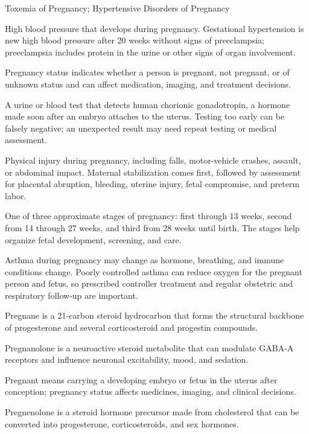 \synonyms
Toxemia of Pregnancy; Hypertensive Disorders of Pregnancy

 High blood pressure that develops during pregnancy. Gestational hypertension is new high blood pressure after 20 weeks without signs of preeclampsia; preeclampsia includes protein in the urine or other signs of organ involvement.

 Pregnancy status indicates whether a person is pregnant, not pregnant, or of unknown status and can affect medication, imaging, and treatment decisions.

 A urine or blood test that detects human chorionic gonadotropin, a hormone made soon after an embryo attaches to the uterus. Testing too early can be falsely negative; an unexpected result may need repeat testing or medical assessment.

 Physical injury during pregnancy, including falls, motor-vehicle crashes, assault, or abdominal impact. Maternal stabilization comes first, followed by assessment for placental abruption, bleeding, uterine injury, fetal compromise, and preterm labor.

 One of three approximate stages of pregnancy: first through 13 weeks, second from 14 through 27 weeks, and third from 28 weeks until birth. The stages help organize fetal development, screening, and care.

 Asthma during pregnancy may change as hormone, breathing, and immune conditions change. Poorly controlled asthma can reduce oxygen for the pregnant person and fetus, so prescribed controller treatment and regular obstetric and respiratory follow-up are important.

 Pregnane is a 21-carbon steroid hydrocarbon that forms the structural backbone of progesterone and several corticosteroid and progestin compounds.

 Pregnanolone is a neuroactive steroid metabolite that can modulate GABA-A receptors and influence neuronal excitability, mood, and sedation.

 Pregnant means carrying a developing embryo or fetus in the uterus after conception; pregnancy status affects medicines, imaging, and clinical decisions.

 Pregnenolone is a steroid hormone precursor made from cholesterol that can be converted into progesterone, corticosteroids, and sex hormones.

